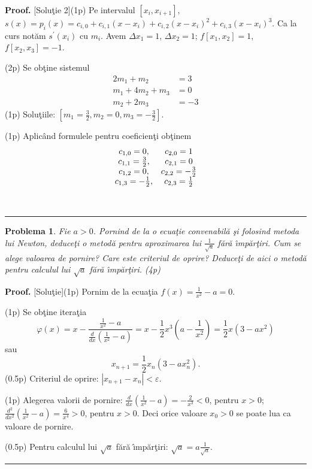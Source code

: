 \documentclass{article}%
\newtheorem{problem}[theorem]{Problema}
\newenvironment{proof}[1][Proof]{\noindent\textbf{#1.} }{\ \rule{0.5em}{0.5em}}
\begin{document}
\begin{proof}
[Solu\c{t}ie 2](1p) Pe intervalul $[x_{i},x_{i+1}],$ $s(x)=p_{i}%
(x)=c_{i,0}+c_{i,1}(x-x_{i})+c_{i,2}(x-x_{i})^{2}+c_{i,3}(x-x_{i})^{3}$. Ca la
curs not\u{a}m $s^{\prime}(x_{i})$ cu $m_{i}$. Avem $\Delta x_{1}=1$, $\Delta
x_{2}=1$; $f[x_{1},x_{2}]=1$, $f[x_{2},x_{3}]=-1$. 

(2p) Se ob\c{t}ine sistemul%
\begin{align*}
2m_{1}+m_{2}  &  =3\\
m_{1}+4m_{2}+m_{3}  &  =0\\
m_{2}+2m_{3}  &  =-3
\end{align*}
(1p) Solu\c{t}iile: $\left[  m_{1}=\frac{3}{2},m_{2}=0,m_{3}=-\frac{3}%
{2}\right]  $. 

(1p) Aplic\^{a}nd formulele pentru coeficien\c{t}i ob\c{t}inem%
\[%
\begin{array}
[c]{cc}%
c_{1,0}=0, & c_{2,0}=1\\
c_{1,1}=\frac{3}{2}, & c_{2,1}=0\\
c_{1,2}=0, & c_{2,2}=-\frac{3}{2}\\
c_{1,3}=-\frac{1}{2}, & c_{2,3}=\frac{1}{2}%
\end{array}
\]

\end{proof}

\begin{problem}
Fie $a>0$. Pornind de la o ecua\c{t}ie convenabil\u{a} \c{s}i folosind metoda
lui Newton, deduce\c{t}i o metod\u{a} pentru aproximarea lui $\frac{1}%
{\sqrt{a}}$ f\u{a}r\u{a} \^{\i}mp\u{a}r\c{t}iri. Cum se alege valoarea de
pornire? Care este criteriul de oprire? Deduce\c{t}i de aici o metod\u{a}
pentru calculul lui $\sqrt{a}$ f\u{a}r\u{a} \^{\i}mp\u{a}r\c{t}iri. (4p)
\end{problem}

\begin{proof}
[Solu\c{t}ie](1p) Pornim de la ecua\c{t}ia $f(x)=\frac{1}{x^{2}}-a=0$. 

(1p) Se ob\c{t}ine itera\c{t}ia
\[
\varphi(x)=x-\frac{\frac{1}{x^{2}}-a}{\frac{d}{dx}\left(  \frac{1}{x^{2}%
}-a\right)  }=\allowbreak x-\frac{1}{2}x^{3}\left(  a-\frac{1}{x^{2}}\right)
=\frac{1}{2}x\left(  3-ax^{2}\right)
\]
sau%
\[
x_{n+1}=\frac{1}{2}x_{n}\left(  3-ax_{n}^{2}\right)  .
\]
(0.5p) Criteriul de oprire: $|x_{n+1}-x_{n}|<\varepsilon$. 

(1p) Alegerea
valorii de pornire: $\frac{d}{dx}\left(  \frac{1}{x^{2}}-a\right)
=\allowbreak-\frac{2}{x^{3}}<0$, pentru $x>0$; $\frac{d^{2}}{dx^{2}}\left(
\frac{1}{x^{2}}-a\right)  =\allowbreak\frac{6}{x^{4}}>0$, pentru $x>0$. Deci
orice valoare $x_{0}>0$ se poate lua ca valoare de pornire. 

(0.5p) Pentru
calculul lui $\sqrt{a}$ f\u{a}r\u{a} \^{\i}mp\u{a}r\c{t}iri: $\sqrt{a}%
=a\frac{1}{\sqrt{a}}$.
\end{proof}
\end{document}
